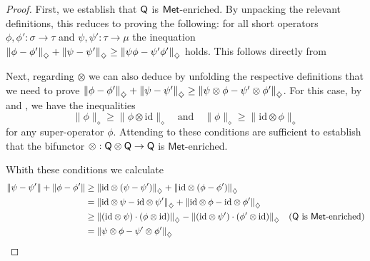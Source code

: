 \documentclass[10pt,a4paper]{amsart}
\theoremstyle{definition}
\theoremstyle{definition}
\theoremstyle{definition}
\theoremstyle{definition}
\theoremstyle{definition}
\theoremstyle{definition}
\begin{document}
\begin{proof}
  First, we establish that $\mathsf{Q}$ is $\mathsf{Met}$-enriched. By unpacking the relevant definitions, this reduces to proving the following: for all short operators $\phi, \phi' : \sigma \to \tau$ and $\psi, \psi' : \tau \to \mu$ the inequation $\left\lVert \phi-\phi' \right\rVert_{\diamondsuit} + \left\lVert \psi-\psi' \right\rVert_{\diamondsuit} \geq \left\lVert \psi\phi-\psi'\phi' \right\rVert_{\diamondsuit} $ holds. This follows directly from \cite[Proposition 3.38 (second statement)]{watrous2018theory}

  Next, regarding $\otimes$ we can also deduce by unfolding the respective definitions that we need to prove $ \left\lVert \phi - \phi' \right\rVert_{\diamondsuit} + \left\lVert \psi - \psi' \right\rVert_{\diamondsuit} \geq \left\lVert \psi \otimes \phi - \psi' \otimes \phi' \right\rVert_{\diamondsuit}$. 
  For this case,  by \cite[Corollary 3.47]{watrous2018theory} and \cite[Proposition 3.44]{watrous2018theory} , we have the inequalities  
  \[
  \| \phi \|_\diamond \geq \| \phi \otimes \mathrm{id} \|_\diamond
  \quad \text{and} \quad  
  \| \phi \|_\diamond \geq \| \mathrm{id} \otimes \phi \|_\diamond
  \]  
  for any super-operator \( \phi \). Attending to \cite[ Proof of proposition 4.1]{dahlqvist2023syntactic} these conditions are sufficient to establish that the bifunctor $\otimes : \mathsf{Q} \otimes \mathsf{Q} \to \mathsf{Q}$ is $\mathsf{Met}$-enriched.


   Whith these conditions we calculate
  \begin{align*}
      \|\psi - \psi'\| + \|\phi - \phi'\| 
      &\geq \left\lVert \mathrm{id} \otimes \left(\psi-\psi'\right) \right\rVert_{\diamondsuit} + \left\lVert \mathrm{id} \otimes \left(\phi-\phi'\right) \right\rVert_{\diamondsuit}  \\
      &=  \left\lVert \mathrm{id} \otimes \psi- \mathrm{id} \otimes\psi' \right\rVert_{\diamondsuit} + \left\lVert \mathrm{id} \otimes \phi- \mathrm{id} \otimes\phi' \right\rVert_{\diamondsuit} \\
      &\geq \left\lVert \left( \mathrm{id} \otimes \psi \right) \cdot \left( \phi \otimes \mathrm{id} \right) \right\rVert_{\diamondsuit} -  \left\lVert \left( \mathrm{id} \otimes \psi' \right) \cdot \left( \phi' \otimes \mathrm{id} \right) \right\rVert_{\diamondsuit} & (\mathsf{Q} \text{ is } \mathsf{Met}\text{-enriched}) \\
      &= \left\lVert \psi \otimes \phi - \psi' \otimes \phi' \right\rVert_{\diamondsuit}
  \end{align*}

\end{proof}
\end{document}
